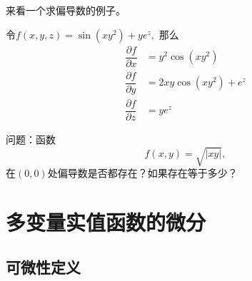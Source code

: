 
\begin{frame}

来看一个求偏导数的例子。

\pause

令$f(x,y,z) = \sin(xy^2) + ye^z,$ 那么
\begin{align*}
\dfrac{\partial f}{\partial x} & = y^2\cos(xy^2) \\
\dfrac{\partial f}{\partial y} & = 2xy\cos(xy^2) + e^z \\
\dfrac{\partial f}{\partial z} & = ye^z
\end{align*}

\pause

问题：函数
$$f(x,y) = \sqrt{|xy|},$$
在$(0,0)$处偏导数是否都存在？如果存在等于多少？

\end{frame}



\section{多变量实值函数的微分}


\subsection{可微性定义}


